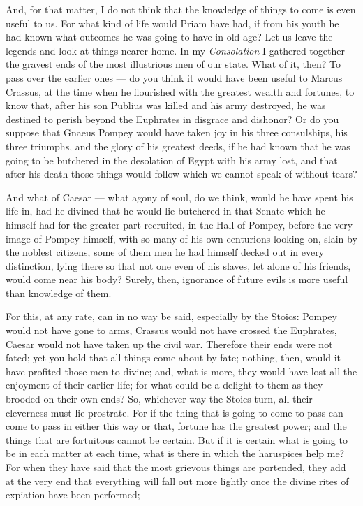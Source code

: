  And, for that matter, I do not think that the knowledge of things to come is even useful to us. For what kind of life would Priam have had, if from his youth he had known what outcomes he was going to have in old age? Let us leave the legends and look at things nearer home. In my \textit{Consolation} I gathered together the gravest ends of the most illustrious men of our state. What of it, then? To pass over the earlier ones — do you think it would have been useful to Marcus Crassus, at the time when he flourished with the greatest wealth and fortunes, to know that, after his son Publius was killed and his army destroyed, he was destined to perish beyond the Euphrates in disgrace and dishonor? Or do you suppose that Gnaeus Pompey would have taken joy in his three consulships, his three triumphs, and the glory of his greatest deeds, if he had known that he was going to be butchered in the desolation of Egypt with his army lost, and that after his death those things would follow which we cannot speak of without tears?

 And what of Caesar — what agony of soul, do we think, would he have spent his life in, had he divined that he would lie butchered in that Senate which he himself had for the greater part recruited, in the Hall of Pompey, before the very image of Pompey himself, with so many of his own centurions looking on, slain by the noblest citizens, some of them men he had himself decked out in every distinction, lying there so that not one even of his slaves, let alone of his friends, would come near his body? Surely, then, ignorance of future evils is more useful than knowledge of them.

 For this, at any rate, can in no way be said, especially by the Stoics: Pompey would not have gone to arms, Crassus would not have crossed the Euphrates, Caesar would not have taken up the civil war. Therefore their ends were not fated; yet you hold that all things come about by fate; nothing, then, would it have profited those men to divine; and, what is more, they would have lost all the enjoyment of their earlier life; for what could be a delight to them as they brooded on their own ends? So, whichever way the Stoics turn, all their cleverness must lie prostrate. For if the thing that is going to come to pass can come to pass in either this way or that, fortune has the greatest power; and the things that are fortuitous cannot be certain. But if it is certain what is going to be in each matter at each time, what is there in which the haruspices help me? For when they have said that the most grievous things are portended, they add at the very end that everything will fall out more lightly once the divine rites of expiation have been performed;

